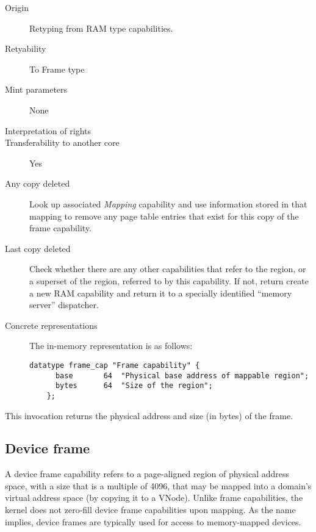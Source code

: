 \begin{description}
\item[Origin] Retyping from RAM type capabilities.
  
\item[Retyability] To Frame type
  
\item[Mint parameters] None
  
\item[Interpretation of rights] 
  
\item[Transferability to another core] Yes

\item[Any copy deleted] Look up associated \emph{Mapping} capability and use
  information stored in that mapping to remove any page table entries that
  exist for this copy of the frame capability.

\item[Last copy deleted] Check whether there are any other capabilities that
  refer to the region, or a superset of the region, referred to by this
    capability. If not, return create a new RAM capability and return it to a
    specially identified ``memory server'' dispatcher.
  
\item[Concrete representations] The in-memory representation is as follows:
  
  \begin{lstlisting}[language=Mackerel]
    datatype frame_cap "Frame capability" {
      base       64  "Physical base address of mappable region";
      bytes      64  "Size of the region";
    };
  \end{lstlisting}
\end{description}  

This invocation returns the physical address and size (in bytes) of the frame.

\subsection{Device frame}
A device frame capability refers to a page-aligned region of physical address
space, with a size that is a multiple of 4096, that may be mapped into a
domain's virtual address space (by copying it to a VNode).
Unlike frame capabilities, the kernel does not zero-fill device frame
capabilities upon mapping.
As the name implies, device frames are typically used for access to
memory-mapped devices.

